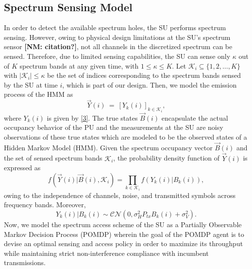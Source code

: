 \documentclass[10pt,twocolumn]{IEEEtran}
\newcommand{\nm}[1]{{\color{blue}\bf{[NM: #1]}}}
\begin{document}
\subsection{Spectrum Sensing Model}
In order to detect the available spectrum holes, the SU performs spectrum sensing. However, owing to physical design limitations at the SU's spectrum sensor \nm{citation?}, not all channels in the discretized spectrum can be sensed. Therefore, due to limited sensing capabilities, the SU can sense only $\kappa$ out of $K$ spectrum bands at any given time, with $1\leq \kappa\leq K$. Let $\mathcal K_{i}\subseteq\{1,2,\dots,K\}$ with $|\mathcal K_i|\leq \kappa$ be the set of indices corresponding to the spectrum bands sensed by the SU at time $i$, which is part of our design. Then, we model the emission process of the HMM as 
\begin{equation}\label{8}
    \vec{Y}(i)\ =\ [Y_k(i)]_{k\in\mathcal K_i},
\end{equation}
where $Y_k(i)$ is given by \eqref{3}.
The true states $\vec{B}(i)$ encapsulate the actual occupancy behavior of the PU and the measurements at the SU are noisy observations of these true states which are modeled to be the observed states of a Hidden Markov Model (HMM). Given the spectrum occupancy vector $\vec{B}(i)$ and the set of sensed spectrum bands $\mathcal K_i$, the probability density function of $\vec{Y}(i)$ is expressed as
\begin{equation}\label{9}
    f(\vec{Y}(i)|\vec{B}(i),\mathcal K_i)=\prod_{k\in\mathcal K_i}f(Y_k(i)|B_k(i)),
\end{equation}
owing to the independence of channels, noise, and transmitted symbols across frequency bands. Moreover,
\begin{equation}\label{10}
 Y_k(i)|B_k(i)\sim \mathcal{CN}(0,\sigma_H^2P_{tx}B_k(i)+\sigma_V^2).
\end{equation}
Now, we model the spectrum access scheme of the SU as a Partially Observable Markov Decision Process (POMDP) wherein the goal of the POMDP agent is to devise an optimal sensing and access policy in order to maximize its throughput while maintaining strict non-interference compliance with incumbent transmissions.
\end{document}
